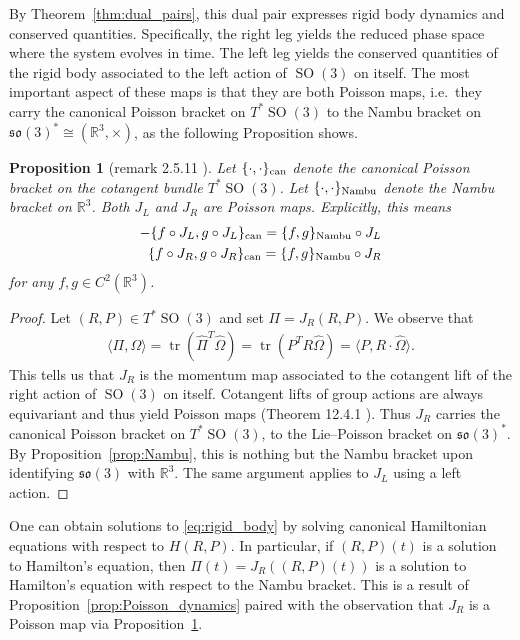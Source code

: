 \documentclass[12pt]{amsart}
\newcommand{\so}{\ensuremath{\mathfrak{so}}}
\newtheorem{prop}[thm]{Proposition}
\DeclareMathOperator{\SO}{SO}
\DeclareMathOperator{\tr}{tr}
\begin{document}
  By Theorem~\ref{thm:dual_pairs}, this dual pair expresses rigid
  body dynamics and conserved quantities.
  Specifically, the right leg yields the reduced phase space where 
  the system evolves in time.
  The left leg yields the conserved quantities of the rigid body
  associated to the left action of $\SO(3)$ on itself.
  The most important aspect of these maps is that they are both Poisson
  maps, i.e.\ they carry the canonical Poisson bracket on $T^* \SO(3)$
  to the Nambu bracket on $\so(3)^* \cong (\mathbb{R}^3,\times)$,
  as the following Proposition shows.

  \begin{prop}[remark 2.5.11 \cite{HolmBook2}] \label{prop:SO3_to_Nambu}
    Let $\{ \cdot , \cdot \}_{\rm can}$ denote the canonical Poisson bracket
    on the cotangent bundle $T^* \SO(3)$.
    Let $\{ \cdot , \cdot \}_{\rm Nambu}$ denote the Nambu bracket on $\mathbb{R}^3$.
    Both $J_L$ and $J_R$ are Poisson maps.
    Explicitly, this means
    \begin{align*}
      -\{ f \circ J_L , g \circ J_L \}_{\rm can} = \{ f , g \}_{\rm Nambu} \circ J_L \\
      \{ f \circ J_R , g \circ J_R \}_{\rm can} = \{ f , g \}_{\rm Nambu} \circ J_R \\
    \end{align*}
    for any $f,g \in C^2( \mathbb{R}^3)$.
  \end{prop}
  \begin{proof}
    Let $(R,P) \in T^* \SO(3)$ and set $\Pi = J_R(R,P)$.
    We observe that
    \begin{align*}
      \langle \Pi , \Omega \rangle
      = \tr( \hat{\Pi}^T \hat{\Omega} ) 
      = \tr( P^T R \hat{\Omega} ) 
      = \langle P , R \cdot \hat{\Omega} \rangle.
    \end{align*}
    This tells us that $J_R$ is the momentum map associated
    to the cotangent lift of the right action of $\SO(3)$ on itself.
    Cotangent lifts of group actions are always equivariant
    and thus yield Poisson maps (Theorem 12.4.1 \cite{MandS}).
    Thus $J_R$ carries the canonical
    Poisson bracket on $T^* \SO(3)$, to the Lie--Poisson
    bracket on $\so(3)^*$.
    By Proposition~\ref{prop:Nambu}, this is nothing but the
    Nambu bracket upon identifying $\so(3)$ with $\mathbb{R}^3$.
    The same argument applies to $J_L$ using a left action.
  \end{proof}

  One can obtain solutions to \eqref{eq:rigid_body}
  by solving canonical Hamiltonian equations with respect to $H(R,P)$.
  In particular, if $(R,P)(t)$ is a solution to Hamilton's equation,
  then $\Pi(t) = J_R( (R,P)(t))$ is a solution to Hamilton's equation
  with respect to the Nambu bracket.
  This is a result of Proposition~\ref{prop:Poisson_dynamics}
  paired with the observation that $J_R$ is a Poisson map via
  Proposition~\ref{prop:SO3_to_Nambu}.
\end{document}
